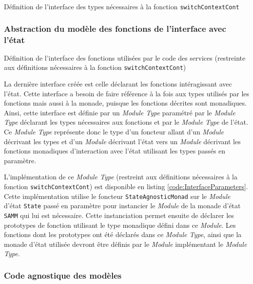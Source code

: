 			\begin{listing}[!ht]
				\caption{Définition de l'interface des types nécessaires à la fonction \texttt{switchContextCont}}
				\label{code:TypesParameters}
			\end{listing}


			\subsubsection{Abstraction du modèle des fonctions de l'interface avec l'état}

			\begin{listing}[!ht]
				\caption{Définition de l'interface des fonctions utilisées par le code des services (restreinte aux définitions nécessaires à la fonction \texttt{switchContextCont})}
				\label{code:InterfaceParameters}
			\end{listing}
			La dernière interface créée est celle déclarant les fonctions intéragissant avec l'état. Cette interface a besoin de faire référence à la fois aux types utilisés par les fonctions mais aussi à la monade, puisque les fonctions décrites sont monadiques. Ainsi, cette interface est définie par un \emph{Module Type} paramétré par le \emph{Module Type} déclarant les types nécessaires aux fonctions et par le \emph{Module Type} de l'état. Ce \emph{Module Type} représente donc le type d'un foncteur allant d'un \emph{Module} décrivant les types et d'un \emph{Module} décrivant l'état vers un \emph{Module} décrivant les fonctions monadiques d'interaction avec l'état utilisant les types passés en paramètre.

			L'implémentation de ce \emph{Module Type} (restreint aux définitions nécessaires à la fonction \texttt{switchContextCont}) est disponible en listing \ref{code:InterfaceParameters}. Cette implémentation utilise le foncteur \texttt{StateAgnosticMonad} sur le \emph{Module} d'état \texttt{State} passé en paramètre pour instancier le \emph{Module} de la monade d'état \texttt{SAMM} qui lui est nécessaire. Cette instanciation permet ensuite de déclarer les prototypes de fonction utilisant le type monadique défini dans ce \emph{Module}. Les fonctions dont les prototypes ont été déclarés dans ce \emph{Module Type}, ainsi que la monade d'état utilisée devront être définis par le \emph{Module} implémentant le \emph{Module Type}.

			\subsubsection{Code agnostique des modèles}

